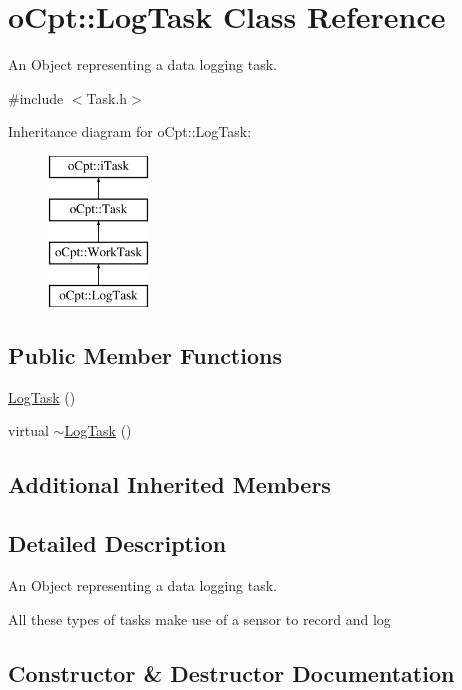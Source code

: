 \hypertarget{classo_cpt_1_1_log_task}{}\section{o\+Cpt\+:\+:Log\+Task Class Reference}
\label{classo_cpt_1_1_log_task}


An Object representing a data logging task.  




{\ttfamily \#include $<$Task.\+h$>$}

Inheritance diagram for o\+Cpt\+:\+:Log\+Task\+:\begin{figure}[H]
\begin{center}
\leavevmode
\includegraphics[height=4.000000cm]{classo_cpt_1_1_log_task}
\end{center}
\end{figure}
\subsection*{Public Member Functions}
\begin{DoxyCompactItemize}
\item 
\hyperlink{classo_cpt_1_1_log_task_aac2dc42f834a76d4eb374ed568d92db9}{Log\+Task} ()
\item 
virtual \hyperlink{classo_cpt_1_1_log_task_a0f80363644cbe0a9c17e78198d466788}{$\sim$\+Log\+Task} ()
\end{DoxyCompactItemize}
\subsection*{Additional Inherited Members}


\subsection{Detailed Description}
An Object representing a data logging task. 

All these types of tasks make use of a sensor to record and log 

\subsection{Constructor \& Destructor Documentation}
